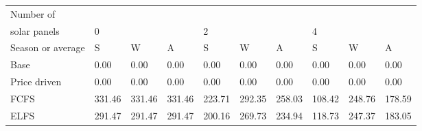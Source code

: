 \begin{table}[h] 
\centering 
\begin{tabular}{l|lll|lll|lll}Number of \\ solar panels&0& & &2& & &4& & \\ \hline 
Season or average & S & W & A & S & W & A & S & W & A \\ \hline 
Base&0.00&0.00&0.00&0.00&0.00&0.00&0.00&0.00&0.00 \\ 
Price driven&0.00&0.00&0.00&0.00&0.00&0.00&0.00&0.00&0.00 \\ 
FCFS&331.46&331.46&331.46&223.71&292.35&258.03&108.42&248.76&178.59 \\ 
ELFS&291.47&291.47&291.47&200.16&269.73&234.94&118.73&247.37&183.05 \\ 
\end{tabular} 
\end{table}